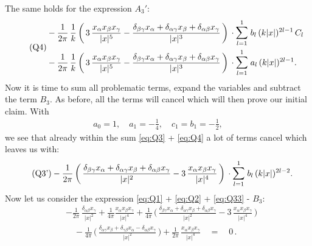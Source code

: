 The same holds for the expression $A_3'$:
\begin{align}
  \label{eq:Q4}
  \tag{Q4}
  \begin{alignedat}{1}
    &- \frac{1}{2\pi} \, \frac{1}{k} \, \bigg(\, 3\, \frac{x_\alpha x_\beta x_\gamma}{|x|^5} - \frac{\delta_{\beta\gamma} x_\alpha + \delta_{\alpha\gamma} x_\beta + \delta_{\alpha\beta} x_\gamma}{|x|^3} \, \bigg)  
   \,\cdot \mathlarger{\sum}_{l = 1}^1 \; b_l \, (k|x|)^{2l - 1} \, C_l  \\
    &- \frac{1}{2\pi} \, \frac{1}{k} \, \bigg( \, 3\, \frac{x_\alpha x_\beta x_\gamma}{|x|^5} - \frac{\delta_{\beta\gamma} x_\alpha + \delta_{\alpha\gamma} x_\beta + \delta_{\alpha\beta} x_\gamma}{|x|^3} \, \bigg)  
  \,\cdot \mathlarger{\sum}_{l = 1}^1 \; a_l \, (k|x|)^{2l - 1} .
  \end{alignedat}
\end{align}
Now it is time to sum all problematic terms, expand the variables and subtract the term $B_3$. 
As before, all the terms will cancel which will then prove our initial claim. 
With
\begin{align*}
  a_0 = 1, \quad a_1 = -\frac{1}{4}, \quad c_1 = b_1 =  -\frac{1}{2},
\end{align*}
we see that already within the sum \eqref{eq:Q3} + \eqref{eq:Q4} a lot of terms cancel which leaves us with:
\begin{align*}
  \label{eq:Q33}
  \tag{Q3'}
  &- \frac{1}{2\pi} \, \bigg(\, \frac{\delta_{\beta\gamma} x_\alpha + \delta_{\alpha \gamma} x_\beta + \delta_{\alpha \beta} x_\gamma}{|x|^2} - 3\, \frac{x_\alpha x_\beta x_\gamma}{|x|^4} \, \bigg) 
  \, \cdot \mathlarger{\sum}_{l = 1}^1 \; b_l \, (k|x|)^{2l - 2}.
\end{align*}
Now let us consider the expression \eqref{eq:Q1} + \eqref{eq:Q2} + \eqref{eq:Q33} - $B_3$:
\begin{align*}
  &-\frac{1}{2\pi} \,  \frac{\delta_{\alpha\beta} x_\gamma}{|x|^2} 
  + \frac{1}{4 \pi } \frac{x_\alpha x_\beta x_\gamma}{|x|^4} 
  + \frac{1}{4\pi} \, \bigg(\,\frac{\delta_{\beta\gamma} x_\alpha + \delta_{\alpha \gamma} x_\beta + \delta_{\alpha \beta} x_\gamma}{|x|^2} - 3\, \frac{x_\alpha x_\beta x_\gamma}{|x|^4} \, \bigg) 
   \\[0.5em]
 &\quad - \frac{1}{4 \pi} \, \bigg(\, \frac{\delta_{\alpha\gamma} x_\beta + \delta_{\gamma\beta} x_\alpha  - \delta_{\alpha\beta} x_\gamma}{|x|^2} \, \bigg) 
  + \frac{1}{2\pi}\,  \frac{x_\alpha x_\beta x_\gamma}{|x|^4}
  \quad = \quad 0\, .
\end{align*}
